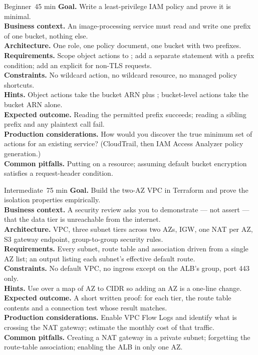 \begin{minilab}{Beginner}{~45 min}
\textbf{Goal.} Write a least-privilege IAM policy and prove it is minimal.\\
\textbf{Business context.} An image-processing service must read and write one prefix of one bucket, nothing else.\\
\textbf{Architecture.} One role, one policy document, one bucket with two prefixes.\\
\textbf{Requirements.} Scope object actions to ; add a separate  statement with a prefix condition; add an explicit  for non-TLS requests.\\
\textbf{Constraints.} No wildcard action, no wildcard resource, no managed policy shortcuts.\\
\textbf{Hints.} Object actions take the bucket ARN plus \code{/*}; bucket-level actions take the bucket ARN alone.\\
\textbf{Expected outcome.} Reading the permitted prefix succeeds; reading a sibling prefix and any plaintext call fail.\\
\textbf{Production considerations.} How would you discover the true minimum set of actions for an existing service? (CloudTrail, then IAM Access Analyzer policy generation.)\\
\textbf{Common pitfalls.} Putting \code{/*} on a  resource; assuming default bucket encryption satisfies a request-header condition.
\end{minilab}

\begin{minilab}{Intermediate}{~75 min}
\textbf{Goal.} Build the two-AZ VPC in Terraform and prove the isolation properties empirically.\\
\textbf{Business context.} A security review asks you to demonstrate --- not assert --- that the data tier is unreachable from the internet.\\
\textbf{Architecture.} VPC, three subnet tiers across two AZs, IGW, one NAT per AZ, S3 gateway endpoint, group-to-group security rules.\\
\textbf{Requirements.} Every subnet, route table and association driven from a single AZ list; an output listing each subnet's effective default route.\\
\textbf{Constraints.} No default VPC, no  ingress except on the ALB's group, port 443 only.\\
\textbf{Hints.} Use  over a map of AZ to CIDR so adding an AZ is a one-line change.\\
\textbf{Expected outcome.} A short written proof: for each tier, the route table contents and a connection test whose result matches.\\
\textbf{Production considerations.} Enable VPC Flow Logs and identify what is crossing the NAT gateway; estimate the monthly cost of that traffic.\\
\textbf{Common pitfalls.} Creating a NAT gateway in a private subnet; forgetting the route-table association; enabling the ALB in only one AZ.
\end{minilab}

